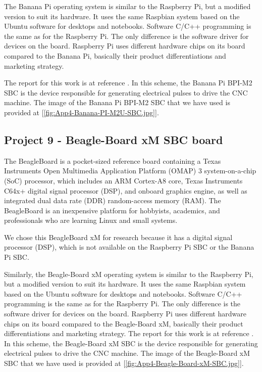 The Banana Pi operating system is similar to the Raspberry Pi, but a modified version to suit its hardware. It uses the same Raspbian system based on the Ubuntu software for desktops and notebooks. Software C/C++ programming is the same as for the Raspberry Pi. The only difference is the software driver for devices on the board. Raspberry Pi uses different hardware chips on its board compared to the Banana Pi, basically their product differentiations and marketing strategy.  
\vspace*{1\baselineskip}

The report for this work is at reference \cite{FYP_Rajeef_2015}. In this scheme, the Banana Pi BPI-M2 SBC is the device responsible for generating electrical pulses to drive the CNC machine. The image of the Banana Pi BPI-M2 SBC that we have used is provided at [\ref{fig:App4-Banana-PI-M2U-SBC.jpg}].

\subsection{Project 9 - Beagle-Board xM SBC board}

The BeagleBoard is a pocket-sized reference board containing a Texas Instruments Open Multimedia Application Platform (OMAP) 3 system-on-a-chip (SoC) processor, which includes an ARM Cortex-A8 core, Texas Instruments C64x+ digital signal processor (DSP), and onboard graphics engine, as well as integrated dual data rate (DDR) random-access memory (RAM). The BeagleBoard is an inexpensive platform for hobbyists, academics, and professionals who are learning Linux and small systems.
\vspace*{1\baselineskip}

We chose this BeagleBoard xM for research because it has a digital signal processor (DSP), which is not available on the Raspberry Pi SBC or the Banana Pi SBC.
\vspace*{1\baselineskip}

Similarly, the Beagle-Board xM operating system is similar to the Raspberry Pi, but a modified version to suit its hardware. It uses the same Raspbian system based on the Ubuntu software for desktops and notebooks. Software C/C++ programming is the same as for the Raspberry Pi. The only difference is the software driver for devices on the board. Raspberry Pi uses different hardware chips on its board compared to the Beagle-Board xM, basically their product differentiations and marketing strategy.  The report for this work is at reference \cite{FYP_Rajeef_2015}. In this scheme, the Beagle-Board xM SBC is the device responsible for generating electrical pulses to drive the CNC machine. The image of the Beagle-Board xM SBC that we have used is provided at [\ref{fig:App4-Beagle-Board-xM-SBC.jpg}].

